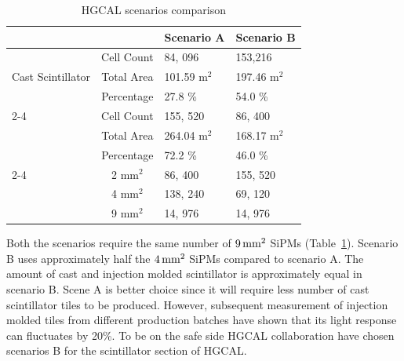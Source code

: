 \begin{table}[!ht]
  \centering
  \caption{\gls{HGCAL} scenarios comparison}\label{tab:scenarios}
  \begin{tabular}{p{1.5in}cll}%
    \toprule
                                                   &                    & Scenario A             & Scenario B             \\
    \midrule
    \multirow{3}{=}{Cast Scintillator}             & Cell Count         & 84, 096                & 153,216                \\
                                                   & Total Area         & 101.59 \(\text{m}^2 \) & 197.46 \(\text{m}^2 \) \\
                                                   & Percentage         & 27.8 \%                & 54.0 \%                \\
    \cmidrule(lr){2-4}
    \multirow{3}{=}{Injection Molded Scintillator} & Cell Count         & 155, 520               & 86, 400                \\
                                                   & Total Area         & 264.04 \(\text{m}^2 \) & 168.17 \(\text{m}^2 \) \\
                                                   & Percentage         & 72.2 \%                & 46.0 \%                \\
    \cmidrule(lr){2-4}
    \multirow{2}{=}{SiPMs Count}                   & 2 \(\text{mm}^2 \) & 86, 400                & 155, 520               \\
                                                   & 4 \(\text{mm}^2 \) & 138, 240               & 69, 120                \\
                                                   & 9 \(\text{mm}^2 \) & 14, 976                & 14, 976                \\
    \bottomrule
  \end{tabular}
\end{table}


Both the scenarios require the same number of \(9 \,\text{mm}{}^{2}\) \glspl{SiPM} (Table~\ref{tab:scenarios}).
Scenario B uses approximately half the \(4 \,\text{mm}{}^{2}\) \glspl{SiPM}
compared to scenario A. The amount of cast and injection molded
scintillator is approximately equal in scenario B.
Scene A is better choice since it will require
less number of cast scintillator tiles to be produced.
However, subsequent measurement of injection
molded tiles from different production batches have shown
that its light response can fluctuates by 20\%.
To be on the safe side \gls{HGCAL} collaboration have chosen
scenarios B for the scintillator section of \gls{HGCAL}.